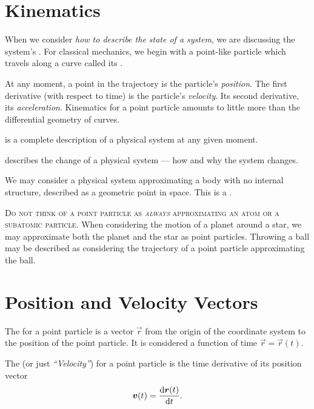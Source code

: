 \section{Kinematics}

When we consider \emph{how to describe the state of a system},
we are discussing the system's . For classical
mechanics, we begin with a point-like particle which travels along a
curve called its .

At any moment, a point in the trajectory is the particle's
\emph{position}. The first derivative (with respect to time) is the
particle's \emph{velocity}. Its second derivative, its
\emph{acceleration}. Kinematics for a point particle amounts to little
more than the differential geometry of curves.


\begin{defn}
 is a complete description of a physical system at
any given moment.
\end{defn}
\begin{defn}
 describes the change of a physical system --- how and
why the system changes.
\end{defn}

We may consider a physical system approximating a body with no internal
structure, described as a geometric point in space. This is a
.

\begin{danger}
\textsc{Do not think of a point particle as \emph{always} approximating
  an atom or a subatomic particle.} When considering the motion of a
planet around a star, we may approximate both the planet and the star as
point particles. Throwing a ball may be described as considering the
trajectory of a point particle approximating the ball.
\end{danger}

\section{Position and Velocity Vectors}

\begin{defn}
The  for a point particle is a vector $\vec{r}$
from the origin of the coordinate system to the position of the point
particle. It is considered a function of time $\vec{r}=\vec{r}(t)$.
\end{defn}

\begin{defn}
The  (or just \emph{``Velocity''}) for a point
particle is the time derivative of its position vector
\begin{equation}
    \vec{v}(t) = \frac{\D\vec{r}(t)}{\D t}.
\end{equation}
\end{defn}

